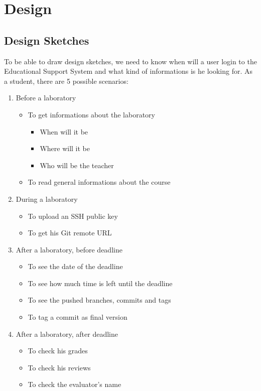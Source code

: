 \chapter{Design}

\section{Design Sketches}
To be able to draw design sketches, we need to know when will a user login to the Educational Support System and what kind of informations is he looking for. As a student, there are 5 possible scenarios:

\begin{enumerate}
	\item Before a laboratory
	\begin{itemize}
		\item To get informations about the laboratory
		\begin{itemize}
			\item When will it be
			\item Where will it be
			\item Who will be the teacher
		\end{itemize}
		\item To read general informations about the course
	\end{itemize}
	
	\item During a laboratory
	\begin{itemize}
		\item To upload an SSH public key
		\item To get his Git remote URL
	\end{itemize}
	
	\item After a laboratory, before deadline
	\begin{itemize}
		\item To see the date of the deadline
		\item To see how much time is left until the deadline
		\item To see the pushed branches, commits and tags
		\item To tag a commit as final version
	\end{itemize}
	
	\item After a laboratory, after deadline
	\begin{itemize}
		\item To check his grades
		\item To check his reviews
		\item To check the evaluator's name
	\end{itemize}
	

\end{enumerate}
